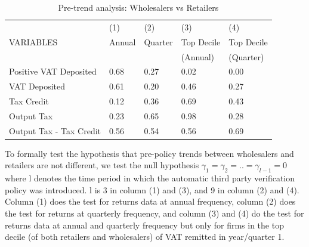 

\begin{table}[h]
\footnotesize
\begin{threeparttable}
\begin{tabular}{lllll} \hline \hline
 & (1) & (2) & (3) & (4) \\
VARIABLES & Annual & Quarter & Top Decile &Top Decile  \\ 
 &  &  & (Annual) & (Quarter)  \\ \hline
Positive VAT Deposited & 0.68  & 0.27 & 0.02 &0.00 \\
VAT Deposited & 0.61 &  0.20 & 0.46 &0.27 \\
Tax Credit & 0.12 & 0.36 & 0.69 & 0.43 \\
Output Tax & 0.23 & 0.65 & 0.98 & 0.28 \\
Output Tax - Tax Credit & 0.56 & 0.54 & 0.56 & 0.69 \\ \hline
\end{tabular}
\begin{tablenotes}
To formally test the hypothesis that pre-policy trends between wholesalers and retailers are not different, we test the null hypothesis $\gamma_1=\gamma_2=..=\gamma_{l-1}=0$ where l denotes the time period in which the automatic third party verification policy was introduced. l is 3 in column (1) and (3), and 9 in column (2) and (4). Column (1) does the test for returns data at annual frequency, column (2) does the test for returns at quarterly frequency, and column (3) and (4) do the test for returns data at annual and quarterly frequency but only for firms in the top decile (of both retailers and wholesalers) of VAT remitted in year/quarter 1.
\end{tablenotes}
\caption{Pre-trend analysis: Wholesalers vs Retailers}
\label{tbl:}
\end{threeparttable}
\end{table}


